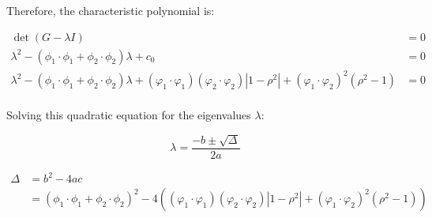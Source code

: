 \documentclass{article}[a4]
\begin{document}
Therefore, the characteristic polynomial is:

\begin{align*}
\det (G - \lambda I) &= 0 \\
\lambda^2 - \left( \phi_1 \cdot \phi_1 + \phi_2 \cdot \phi_2 \right) \lambda + c_0 &= 0 \\
\lambda^2 - \left( \phi_1 \cdot \phi_1 + \phi_2 \cdot \phi_2 \right) \lambda + \left( \varphi_1\cdot\varphi_1 \right) \left( \varphi_2\cdot\varphi_2 \right) \left| 1 - \rho^2 \right| + \left( \varphi_1\cdot\varphi_2 \right)^2 \left( \rho^2 - 1 \right) &= 0 \\
\end{align*}

Solving this quadratic equation for the eigenvalues \(\lambda\):

\begin{equation*}
\lambda = \frac{-b \pm \sqrt{\Delta}}{2a}
\end{equation*}

\begin{align*}
\Delta &= b^2 - 4ac \\
  &= \left( \phi_1 \cdot \phi_1 + \phi_2 \cdot \phi_2 \right)^2 - 4 \left( \left( \varphi_1\cdot\varphi_1 \right) \left( \varphi_2\cdot\varphi_2 \right) \left| 1 - \rho^2 \right| + \left( \varphi_1\cdot\varphi_2 \right)^2 \left( \rho^2 - 1 \right) \right) \\
\end{align*}
\end{document}
